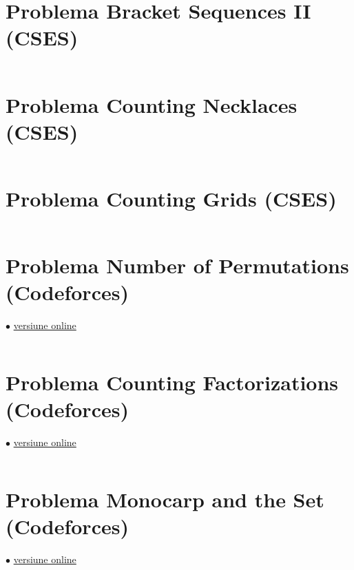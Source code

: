 \documentclass[../main.tex]{subfiles}
\begin{document}
\inputminted{cpp}{../src/math/bracket-sequences-1.cpp}

\section{Problema Bracket Sequences II (CSES)}
\label{code:bracket-sequences-2}

\inputminted{cpp}{../src/math/bracket-sequences-2.cpp}

\section{Problema Counting Necklaces (CSES)}
\label{code:counting-necklaces}

\inputminted{cpp}{../src/math/counting-necklaces.cpp}

\section{Problema Counting Grids (CSES)}
\label{code:counting-grids}

\inputminted{cpp}{../src/math/counting-grids.cpp}

\section{Problema Number of Permutations (Codeforces)}
\label{code:number-of-permutations}
$\bullet$
\href{https://codeforces.com/contest/1207/submission/303203282}{versiune online}

\inputminted{cpp}{../src/math/number-of-permutations.cpp}

\section{Problema Counting Factorizations (Codeforces)}
\label{code:counting-factorizations}
$\bullet$
\href{https://codeforces.com/contest/1794/submission/303226137}{versiune online}

\inputminted{cpp}{../src/math/counting-factorizations.cpp}

\section{Problema Monocarp and the Set (Codeforces)}
\label{code:monocarp-and-the-set}
$\bullet$
\href{https://codeforces.com/contest/1886/submission/241020853}{versiune online}
\end{document}
